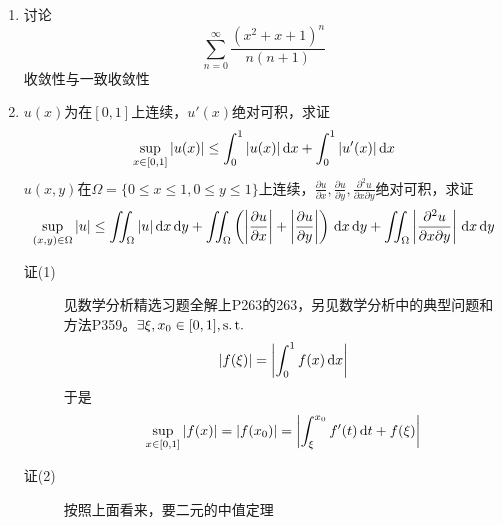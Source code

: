 \begin{enumerate}
\item 讨论
\[
\sum_{n=0}^{\infty} \frac{(x^2+x+1)^n}{n(n+1)}
\]
收敛性与一致收敛性

\item $u(x)$为在$[0,1]$上连续，$u'(x)$绝对可积，求证
\[
\sup_{x\in [0,1]} |u(x)| \leq \int_0^1 |u(x)|\,\mathrm{d} x+\int_0^1 |u'(x)|\,\mathrm{d} x
\]
$u(x,y)$在$\Omega = \{0\leq x\leq 1,0\leq y\leq 1\}$上连续，$\frac{\partial u}{\partial x},\frac{\partial u}{\partial y},\frac{\partial^2 u}{\partial x\partial y}$绝对可积，求证
\[
\sup_{(x,y)\in \Omega} |u|\leq\iint_\Omega |u|\,\mathrm{d} x\,\mathrm{d} y+\iint_\Omega\left( \left|\frac{\partial u}{\partial x}\right|+\left|\frac{\partial u}{\partial y}\right|\right)\,\mathrm{d} x\,\mathrm{d} y+\iint_\Omega\left|\frac{\partial^2 u}{\partial x\partial y}\right|\,\mathrm{d} x\,\mathrm{d} y
\]
\begin{description}
\item[证(1)] 见数学分析精选习题全解上P263的263，另见数学分析中的典型问题和方法P359。$\exists \xi,x_0\in[0,1],\operatorname{s.t.}$
\[
|f(\xi)| = \left|\int_0^1 f(x)\,\mathrm{d} x \right|
\]
于是
\[
\sup_{x\in [0,1]}|f(x)| = |f(x_0)| = \left|\int_\xi^{x_0} f'(t)\,\mathrm{d} t +f(\xi)\right|
\]
\item[证(2)] 按照上面看来，要二元的中值定理
\end{description}















\end{enumerate}